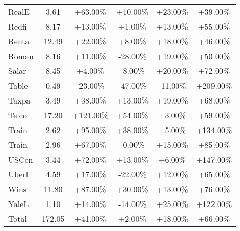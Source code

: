 \begin{table}
\begin{tabular}{|l|c|c|c|c|c|}
RealE & 3.61 & +63.00\% & +10.00\% & +23.00\% & +39.00\% \\
Redfi & 8.17 & +13.00\% & +1.00\% & +13.00\% & +55.00\% \\
Renta & 12.49 & +22.00\% & +8.00\% & +18.00\% & +46.00\% \\
Roman & 8.16 & +11.00\% & -28.00\% & +19.00\% & +50.00\% \\
Salar & 8.45 & +4.00\% & -8.00\% & +20.00\% & +72.00\% \\
Table & 0.49 & -23.00\% & -47.00\% & -11.00\% & +209.00\% \\
Taxpa & 3.49 & +38.00\% & +13.00\% & +19.00\% & +68.00\% \\
Telco & 17.20 & +121.00\% & +54.00\% & +3.00\% & +59.00\% \\
Train & 2.62 & +95.00\% & +38.00\% & +5.00\% & +134.00\% \\
Train & 2.96 & +67.00\% & -0.00\% & +15.00\% & +85.00\% \\
USCen & 3.44 & +72.00\% & +13.00\% & +6.00\% & +147.00\% \\
Uberl & 4.59 & +17.00\% & -22.00\% & +12.00\% & +65.00\% \\
Wins & 11.80 & +87.00\% & +30.00\% & +13.00\% & +76.00\% \\
YaleL & 1.10 & +14.00\% & -14.00\% & +25.00\% & +122.00\% \\
Total & 172.05 & +41.00\% & +2.00\% & +18.00\% & +66.00\% \\
\bottomrule
\end{tabular}
\end{table}

